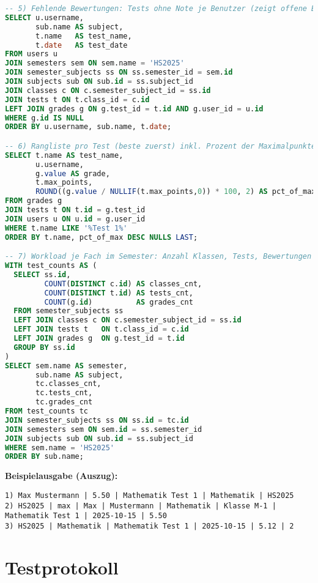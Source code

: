\documentclass[12pt,a4paper]{article}
\begin{document}
\begin{lstlisting}[language=SQL]
-- 5) Fehlende Bewertungen: Tests ohne Note je Benutzer (zeigt offene Bewertungen)
SELECT u.username,
       sub.name AS subject,
       t.name   AS test_name,
       t.date   AS test_date
FROM users u
JOIN semesters sem ON sem.name = 'HS2025'
JOIN semester_subjects ss ON ss.semester_id = sem.id
JOIN subjects sub ON sub.id = ss.subject_id
JOIN classes c ON c.semester_subject_id = ss.id
JOIN tests t ON t.class_id = c.id
LEFT JOIN grades g ON g.test_id = t.id AND g.user_id = u.id
WHERE g.id IS NULL
ORDER BY u.username, sub.name, t.date;

-- 6) Rangliste pro Test (beste zuerst) inkl. Prozent der Maximalpunkte
SELECT t.name AS test_name,
       u.username,
       g.value AS grade,
       t.max_points,
       ROUND((g.value / NULLIF(t.max_points,0)) * 100, 2) AS pct_of_max
FROM grades g
JOIN tests t ON t.id = g.test_id
JOIN users u ON u.id = g.user_id
WHERE t.name LIKE '%Test 1%'
ORDER BY t.name, pct_of_max DESC NULLS LAST;

-- 7) Workload je Fach im Semester: Anzahl Klassen, Tests, Bewertungen
WITH test_counts AS (
  SELECT ss.id,
         COUNT(DISTINCT c.id) AS classes_cnt,
         COUNT(DISTINCT t.id) AS tests_cnt,
         COUNT(g.id)          AS grades_cnt
  FROM semester_subjects ss
  LEFT JOIN classes c ON c.semester_subject_id = ss.id
  LEFT JOIN tests t   ON t.class_id = c.id
  LEFT JOIN grades g  ON g.test_id = t.id
  GROUP BY ss.id
)
SELECT sem.name AS semester,
       sub.name AS subject,
       tc.classes_cnt,
       tc.tests_cnt,
       tc.grades_cnt
FROM test_counts tc
JOIN semester_subjects ss ON ss.id = tc.id
JOIN semesters sem ON sem.id = ss.semester_id
JOIN subjects sub ON sub.id = ss.subject_id
WHERE sem.name = 'HS2025'
ORDER BY sub.name;
    \end{lstlisting}

    \textbf{Beispielausgabe (Auszug):}
    \begin{verbatim}
1) Max Mustermann | 5.50 | Mathematik Test 1 | Mathematik | HS2025
2) HS2025 | max | Max | Mustermann | Mathematik | Klasse M-1 | Mathematik Test 1 | 2025-10-15 | 5.50
3) HS2025 | Mathematik | Mathematik Test 1 | 2025-10-15 | 5.12 | 2
    \end{verbatim}
    \newpage



    \section{Testprotokoll}
\end{document}
